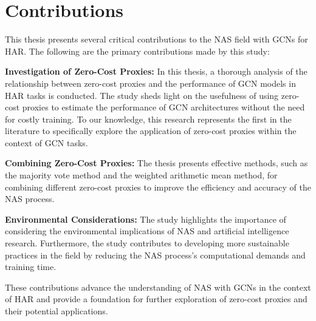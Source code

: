 \section{Contributions}

This thesis presents several critical contributions to the \gls{NAS} field with \glspl{GCN} for \gls{HAR}. The following are the primary contributions made by this study:

\textbf{Investigation of Zero-Cost Proxies:} In this thesis, a thorough analysis of the relationship between zero-cost proxies and the performance of \gls{GCN} models in \gls{HAR} tasks is conducted. The study sheds light on the usefulness of using zero-cost proxies to estimate the performance of \gls{GCN} architectures without the need for costly training. To our knowledge, this research represents the first in the literature to specifically explore the application of zero-cost proxies within the context of \gls{GCN} tasks.

\textbf{Combining Zero-Cost Proxies:} The thesis presents effective methods, such as the majority vote method and the weighted arithmetic mean method, for combining different zero-cost proxies to improve the efficiency and accuracy of the \gls{NAS} process. 

\textbf{Environmental Considerations:} The study highlights the importance of considering the environmental implications of \gls{NAS} and artificial intelligence research. Furthermore, the study contributes to developing more sustainable practices in the field by reducing the \gls{NAS} process's computational demands and training time.

\begin{comment}
    
\textbf{Identification of Limitations and Future Research Directions:} The thesis acknowledges the current study's limitations and provides a roadmap for future research to address these limitations.
\end{comment}

These contributions advance the understanding of \gls{NAS} with \glspl{GCN} in the context of \gls{HAR} and provide a foundation for further exploration of zero-cost proxies and their potential applications.